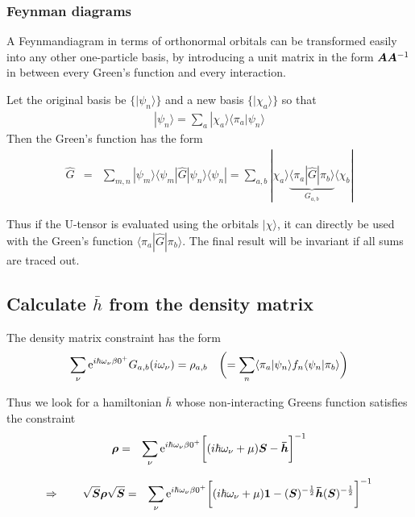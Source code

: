 \documentclass[11pt,a4paper]{report}
\begin{document}
\subsubsection{Feynman diagrams}
A Feynmandiagram in terms of orthonormal orbitals can be transformed
easily into any other one-particle basis, by introducing a unit matrix
in the form $\bm{A}\bm{A}^{-1}$ in between every Green's function
and every interaction. 

Let the original basis be $\{|\psi_n\rangle\}$
and a new basis $\{|\chi_a\rangle\}$ so that
\begin{eqnarray}
|\psi_n\rangle=\sum_a |\chi_a\rangle\langle\pi_a|\psi_n\rangle
\end{eqnarray}
Then the Green's function has the form
\begin{eqnarray}
\hat{G}&=&\sum_{m,n}|\psi_m\rangle
\langle\psi_m|\hat{G}|\psi_n\rangle\langle\psi_n|
=
\sum_{a,b}|\chi_a\rangle
\underbrace{\langle\pi_a|\hat{G}|\pi_b\rangle}_{G_{a,b}}\langle\chi_b|
\end{eqnarray}

Thus if the U-tensor is evaluated using the orbitals $|\chi\rangle$,
it can directly be used with the Green's function
$\langle\pi_a|\hat{G}|\pi_b\rangle$. The final result will be
invariant if all sums are traced out.


\subsection{Calculate $\bar{h}$ from the density matrix}
The density matrix constraint has the form
\begin{eqnarray}
\sum_\nu\mathrm{e}^{i\hbar\omega_\nu\beta0^+}G_{a,b}(i\omega_\nu)
=\rho_{a,b} 
\quad\biggl(=\sum_n\langle\pi_a|\psi_n\rangle f_n\langle\psi_n|\pi_b\rangle
\biggr)
\end{eqnarray}


Thus we look for a hamiltonian $\bar{h}$ whose non-interacting Greens
function satisfies the constraint
\begin{eqnarray}
\bm{\rho}
&=&\sum_\nu\mathrm{e}^{i\hbar\omega_\nu\beta0^+}
\biggl[(i\hbar\omega_\nu+\mu)\bm{S}-\bm{\bar{h}}\biggr]^{-1}
\end{eqnarray}

\begin{eqnarray}
\Rightarrow\qquad
\sqrt{\bm{S}}\bm{\rho}\sqrt{\bm{S}}
&=&\sum_\nu\mathrm{e}^{i\hbar\omega_\nu\beta0^+}
\biggl[(i\hbar\omega_\nu+\mu)\bm{1}
-(\bm{S})^{-\frac{1}{2}}\bm{\bar{h}}(\bm{S})^{-\frac{1}{2}}\biggr]^{-1}
\end{eqnarray}
\end{document}

